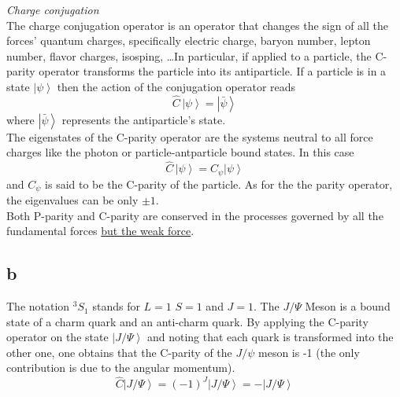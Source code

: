 \raggedright\emph{Charge conjugation} \\
\vspace{10pt} 
The charge conjugation operator is an operator that changes the sign of all the forces' quantum charges, specifically electric charge, baryon number, lepton number, flavor charges, isosping, \dots In particular, if applied to a particle, the C-parity operator 
transforms the particle into its antiparticle. If a particle is in a state $\left| \psi \right\rangle$ then the action of the conjugation operator reads 
\begin{equation*}
    \hat C \, \left| \psi \right\rangle = \left| \bar\psi \right\rangle
\end{equation*}
where $\left| \bar\psi \right\rangle$ represents the antiparticle's state. \\
The eigenstates of the C-parity operator are the systems neutral to all force charges like the photon or particle-antparticle bound states. In this case
\begin{equation*}
    \hat C \, \left| \psi \right\rangle = C_{\psi} \left| \psi \right\rangle
\end{equation*}
and $C_{\psi}$ is said to be the C-parity of the particle. As for the the parity operator, the eigenvalues can be only $\pm 1$. \\
Both P-parity and C-parity are conserved in the processes governed by all the fundamental forces \href{https://en.wikipedia.org/wiki/Weak_interaction#Violation_of_symmetry}{but the weak force}.

\subsection*{b}
The notation $^3S_1$ stands for $L=1$ $S=1$ and $J=1$. The $J/\Psi$ Meson is a bound state of a charm quark and an anti-charm quark. By applying the C-parity operator on the state $\left|J/\Psi\right\rangle$ and noting that each quark is transformed into the other one,
one obtains that the C-parity of the $J/\psi$ meson is -1 (the only contribution is due to the angular momentum).
\begin{equation*}
    \hat C \left|J/\Psi\right\rangle = (-1)^J\left|J/\Psi\right\rangle = -\left|J/\Psi\right\rangle
\end{equation*}

